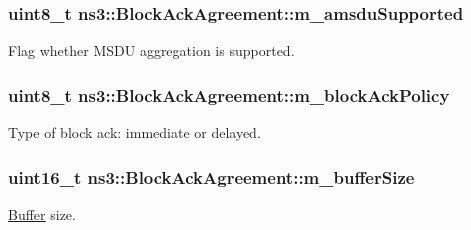 \subsubsection[{\texorpdfstring{m\+\_\+amsdu\+Supported}{m_amsduSupported}}]{\setlength{\rightskip}{0pt plus 5cm}uint8\+\_\+t ns3\+::\+Block\+Ack\+Agreement\+::m\+\_\+amsdu\+Supported\hspace{0.3cm}{\ttfamily [protected]}}\hypertarget{classns3_1_1BlockAckAgreement_ac344be8377041fb6d85c93fb24f5ca0a}{}\label{classns3_1_1BlockAckAgreement_ac344be8377041fb6d85c93fb24f5ca0a}


Flag whether M\+S\+DU aggregation is supported. 

\subsubsection[{\texorpdfstring{m\+\_\+block\+Ack\+Policy}{m_blockAckPolicy}}]{\setlength{\rightskip}{0pt plus 5cm}uint8\+\_\+t ns3\+::\+Block\+Ack\+Agreement\+::m\+\_\+block\+Ack\+Policy\hspace{0.3cm}{\ttfamily [protected]}}\hypertarget{classns3_1_1BlockAckAgreement_a7da1f279216c42ae0cf8bc1b68f7d614}{}\label{classns3_1_1BlockAckAgreement_a7da1f279216c42ae0cf8bc1b68f7d614}


Type of block ack\+: immediate or delayed. 

\subsubsection[{\texorpdfstring{m\+\_\+buffer\+Size}{m_bufferSize}}]{\setlength{\rightskip}{0pt plus 5cm}uint16\+\_\+t ns3\+::\+Block\+Ack\+Agreement\+::m\+\_\+buffer\+Size\hspace{0.3cm}{\ttfamily [protected]}}\hypertarget{classns3_1_1BlockAckAgreement_aa26b08618a027c94e08e2705d864e97c}{}\label{classns3_1_1BlockAckAgreement_aa26b08618a027c94e08e2705d864e97c}


\hyperlink{classns3_1_1Buffer}{Buffer} size. 

